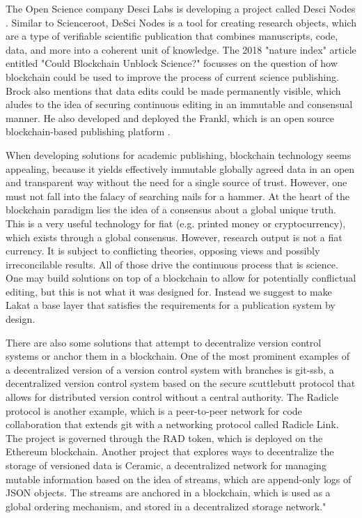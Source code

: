 The Open Science company Desci Labs is developing a project called Desci Nodes \cite{descilabs}. Similar to Scienceroot, DeSci Nodes is a tool for creating research objects, which are a type of verifiable scientific publication that combines manuscripts, code, data, and more into a coherent unit of knowledge.  
The 2018 "nature index" article \cite{brock2018} entitled "Could Blockchain Unblock Science?" focusses on the question of how blockchain could be used to improve the process of current science publishing. Brock also mentions that data edits could be made permanently visible, which aludes to the idea of securing continuous editing in an immutable and consensual manner. He also developed and deployed the Frankl, which is an open source blockchain-based publishing platform \cite{brockopenscience2018}. 

When developing solutions for academic publishing, blockchain technology seems appealing, because it yields effectively immutable globally agreed data in an open and transparent way without the need for a single source of trust. However, one must not fall into the falacy of searching nails for a hammer. At the heart of the blockchain paradigm lies the idea of a consensus about a global unique truth. This is a very useful technology for fiat (e.g. printed money or cryptocurrency), which exists through a global consensus. However, research output is not a fiat currency. It is subject to conflicting theories, opposing views and possibly irreconcilable results. All of those drive the continuous process that is science. One may build solutions on top of a blockchain to allow for potentially conflictual editing, but this is not what it was designed for. Instead we suggest to make Lakat a base layer that satisfies the requirements for a publication system by design.
   
There are also some solutions that attempt to decentralize version control systems or anchor them in a blockchain. One of the most prominent examples of a decentralized version of a version control system with branches is git-ssb, a decentralized version control system based on the secure scuttlebutt protocol that allows for distributed version control without a central authority\cite{gitssb}. The Radicle protocol is another example, which is a peer-to-peer network for code collaboration that extends git with a networking protocol called Radicle Link\cite{radicle}. The project is governed through the RAD token, which is deployed on the Ethereum blockchain. Another project that explores ways to decentralize the storage of versioned data is Ceramic, a decentralized network for managing mutable information based on the idea of streams, which are append-only logs of JSON objects. The streams are anchored in a blockchain, which is used as a global ordering mechanism, and stored in a decentralized storage network\cite{ceramic}."

